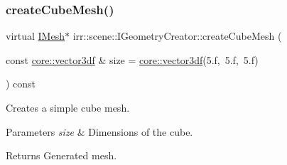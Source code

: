 \subsubsection{\texorpdfstring{create\+Cube\+Mesh()}{createCubeMesh()}\hspace{0.1cm}{\footnotesize\ttfamily [2/2]}}
{\footnotesize\ttfamily virtual \hyperlink{classirr_1_1scene_1_1IMesh}{I\+Mesh}$\ast$ irr\+::scene\+::\+I\+Geometry\+Creator\+::create\+Cube\+Mesh (\begin{DoxyParamCaption}\item[{const \hyperlink{namespaceirr_1_1core_ae6e2b2a6c552833ebbd5b7463d03586b}{core\+::vector3df} \&}]{size = {\ttfamily \hyperlink{namespaceirr_1_1core_ae6e2b2a6c552833ebbd5b7463d03586b}{core\+::vector3df}(5.f,~5.f,~5.f)} }\end{DoxyParamCaption}) const\hspace{0.3cm}{\ttfamily [pure virtual]}}



Creates a simple cube mesh. 


\begin{DoxyParams}{Parameters}
{\em size} & Dimensions of the cube. \\
\hline
\end{DoxyParams}
\begin{DoxyReturn}{Returns}
Generated mesh. 
\end{DoxyReturn}
\mbox{\label{classirr_1_1scene_1_1IGeometryCreator_a87143de278ac305bc37dc905e800f5f8}} 
